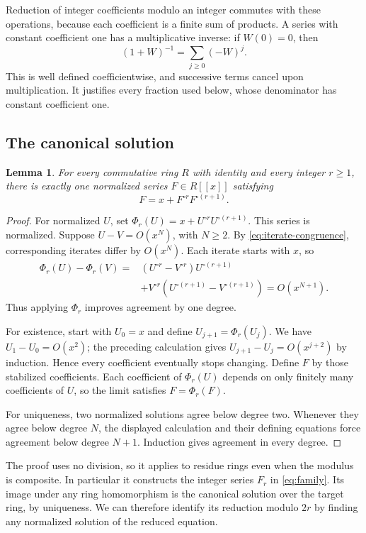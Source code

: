 \documentclass[11pt,a4paper]{article}
\newtheorem{lemma}[theorem]{Lemma}
\theoremstyle{remark}\newtheorem{remark}[theorem]{Remark}
\begin{document}
Reduction of integer coefficients modulo an integer commutes with
these operations, because each coefficient is a finite sum of
products. A series with constant coefficient one has a multiplicative
inverse: if $W(0)=0$, then
\[
(1+W)^{-1}=\sum_{j\ge0}(-W)^j.
\]
This is well defined coefficientwise, and successive terms cancel
upon multiplication. It justifies every fraction used below, whose
denominator has constant coefficient one.

\subsection{The canonical solution}

\begin{lemma}\label{lem:unique}
For every commutative ring $R$ with identity and every integer $r\ge1$,
there is exactly one normalized series $F\in R[[x]]$ satisfying
\[
F=x+F^{\circ r}F^{\circ(r+1)}.
\]
\end{lemma}

\begin{proof}
For normalized $U$, set
$\Phi_r(U)=x+U^{\circ r}U^{\circ(r+1)}$.
This series is normalized. Suppose $U-V=O(x^N)$, with $N\ge2$.
By \eqref{eq:iterate-congruence}, corresponding iterates differ by
$O(x^N)$. Each iterate starts with $x$, so
\begin{align*}
\Phi_r(U)-\Phi_r(V)
={}&(U^{\circ r}-V^{\circ r})U^{\circ(r+1)}\\
&+V^{\circ r}(U^{\circ(r+1)}-V^{\circ(r+1)})
=O(x^{N+1}).
\end{align*}
Thus applying $\Phi_r$ improves agreement by one degree.

For existence, start with $U_0=x$ and define
$U_{j+1}=\Phi_r(U_j)$. We have $U_1-U_0=O(x^2)$; the preceding
calculation gives $U_{j+1}-U_j=O(x^{j+2})$ by induction. Hence every
coefficient eventually stops changing. Define $F$ by those stabilized
coefficients. Each coefficient of $\Phi_r(U)$ depends on only finitely
many coefficients of $U$, so the limit satisfies $F=\Phi_r(F)$.

For uniqueness, two normalized solutions agree below degree two.
Whenever they agree below degree $N$, the displayed calculation and
their defining equations force agreement below degree $N+1$.
Induction gives agreement in every degree.
\end{proof}

The proof uses no division, so it applies to residue rings even when
the modulus is composite. In particular it constructs the integer
series $F_r$ in \eqref{eq:family}. Its image under any ring
homomorphism is the canonical solution over the target ring, by
uniqueness. We can therefore identify its reduction modulo $2r$ by
finding any normalized solution of the reduced equation.
\end{document}
